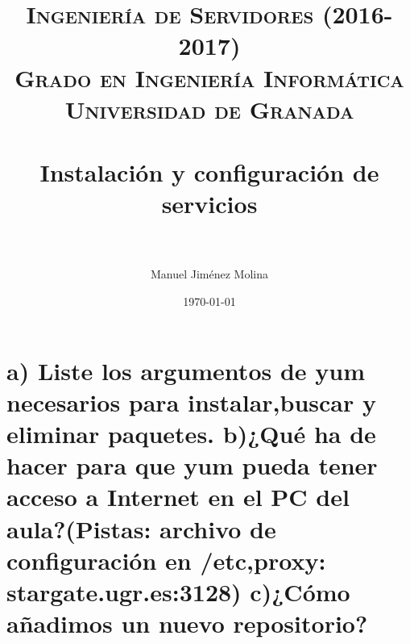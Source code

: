 
\title{	
	\normalfont \normalsize 
	\textsc{{\bf Ingeniería de Servidores (2016-2017)} \\ Grado en Ingeniería Informática \\ Universidad de Granada} \\ [25pt] %
	\horrule{0.5pt} \\[0.4cm] %
	\huge Instalación y configuración de servicios \\ %
	\horrule{2pt} \\[0.5cm] %
}

\author{Manuel Jiménez Molina} %

\date{\normalsize\today} %



	
	\maketitle %
	
	\newpage %
	
	\tableofcontents %
	
	\listoffigures
	
	\listoftables
	
	\newpage
	
	
	
	
	
	\newpage
	
	
	\section{a) Liste los argumentos de yum necesarios para instalar,buscar y eliminar paquetes. b)¿Qué ha de hacer para que yum pueda tener acceso a Internet en el PC del aula?(Pistas: archivo de configuración en /etc,proxy: stargate.ugr.es:3128) c)¿Cómo añadimos un nuevo repositorio?}
	
